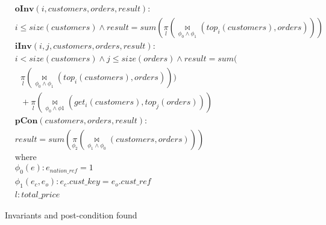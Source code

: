\begin{figure*}[h]
\centering
\begin{align*}
& \textbf{oInv}(i,customers,orders,result) : \\
& i \leqslant size(customers) \wedge result = sum(\underset{l}{\pi}(\underset{\phi_0 \wedge \phi_1}{\bowtie}(top_i(customers), orders))) \\
& \textbf{iInv}(i,j,customers,orders,result) : \\
& i < size(customers) \wedge j \leqslant size(orders) \wedge result = sum( \\
& \text{  } \underset{l}{\pi}(\underset{\phi_0 \wedge \phi_1}{\bowtie}(top_i(customers), orders))) \\
& \text{  } + \underset{l}{\pi} (\underset{\phi_0 \wedge \phi1}{\bowtie}(get_i(customers), top_j(orders))) \\
& \textbf{pCon}(customers,orders,result) : \\
& result = sum(\underset{\phi_2}{\pi}(\underset{\phi_1 \wedge \phi_0}{\bowtie}(customers, orders))) \\
& \text{where} \\
& \phi_0(e) : e_{nation\_ref} = 1 \\
& \phi_1(e_c, e_o) : e_c.cust\_key = e_o.cust\_ref \\
& l : total\_price
\end{align*}
\caption{Invariants and post-condition found}
\label{eq:found}
\end{figure*}


